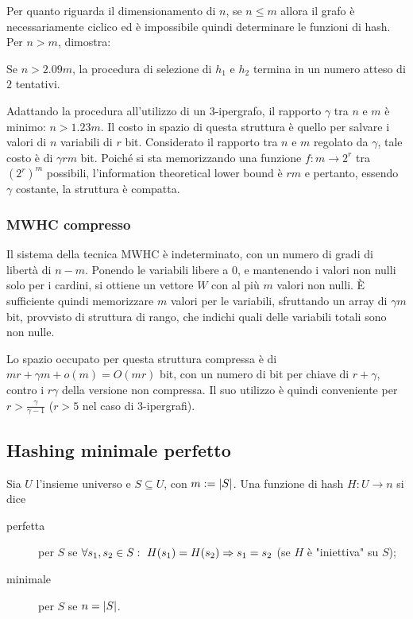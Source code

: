 
Per quanto riguarda il dimensionamento di $n$, se $n\leq m$ allora il grafo è necessariamente ciclico ed è impossibile quindi determinare le funzioni di hash.
Per $n>m$, \cite{Majewski:96:MWHC} dimostra:
\begin{theorem}
	Se $n>2.09m$, la procedura di selezione di $h_1$ e $h_2$ termina in un numero atteso di $2$ tentativi.
\end{theorem}
Adattando la procedura all'utilizzo di un $3$-ipergrafo, il rapporto $\gamma$ tra $n$ e $m$ è minimo: $n>1.23m$.
Il costo in spazio di questa struttura è quello per salvare i valori di $n$ variabili di $r$ bit. Considerato il rapporto tra $n$ e $m$ regolato da $\gamma$, tale costo è di $\gamma rm$ bit. Poiché si sta memorizzando una funzione $f:m\to 2^r$ tra $(2^r)^m$ possibili, l'information theoretical lower bound è $rm$ e pertanto, essendo $\gamma$ costante, la struttura è compatta.

\subsubsection{MWHC compresso}
Il sistema della tecnica MWHC è indeterminato, con un numero di gradi di libertà di $n-m$. Ponendo le variabili libere a $0$, e mantenendo i valori non nulli solo per i cardini, si ottiene un vettore $W$ con al più $m$ valori non nulli.
È sufficiente quindi memorizzare $m$ valori per le variabili, sfruttando un array di $\gamma m$ bit, provvisto di struttura di rango, che indichi quali delle variabili totali sono non nulle.

Lo spazio occupato per questa struttura compressa è di $mr+\gamma m+o(m)=O(mr)$ bit, con un numero di bit per chiave di $r+\gamma$, contro i $r\gamma$ della versione non compressa.
Il suo utilizzo è quindi conveniente per $r>\frac{\gamma}{\gamma-1}$ ($r>5$ nel caso di $3$-ipergrafi).


\subsection{Hashing minimale perfetto}
Sia $U$ l'insieme universo e $S\subseteq U$, con $m:=| S |$. Una funzione di hash $H:U\to n$ si dice
\begin{description}
	\item[perfetta] per $S$ se $\forall s_1,s_2\in S:~H(s_1)=H(s_2)\Rightarrow s_1=s_2$ (se $H$ è "iniettiva" su $S$);
	\item[minimale] per $S$ se $n=| S |$.
\end{description}

